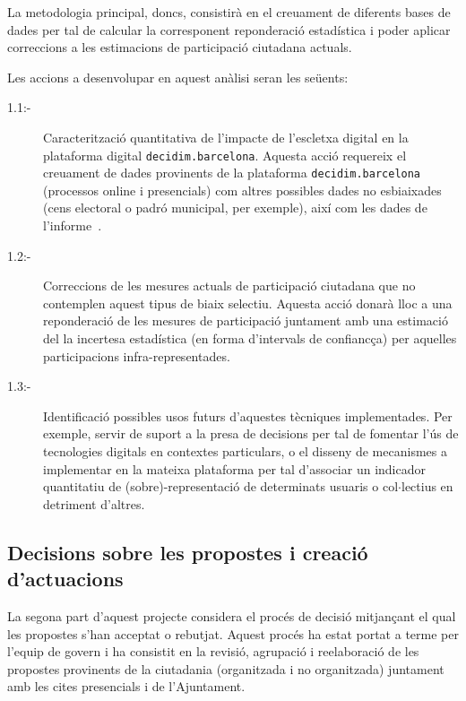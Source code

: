 \documentclass[final,10pt]{article}
\begin{document}
La metodologia principal, doncs, consistir\`a en el creuament de diferents bases de dades per tal de calcular la corresponent reponderaci\'o estad\'istica i poder aplicar correccions a les estimacions de participaci\'o ciutadana actuals.

Les accions a desenvolupar en aquest an\`alisi seran les se\"uents:
\begin{description}
\item[1.1:-] Caracteritzaci\'o quantitativa de l'impacte de l'escletxa digital en la plataforma digital \texttt{decidim.barcelona}.
Aquesta acci\'o requereix el creuament de dades provinents de la plataforma \texttt{decidim.barcelona} (processos online i presencials) com altres possibles dades no esbiaixades (cens electoral o padr\'o municipal, per exemple), aix\'i com les dades de l'informe~\cite{digital}.
\item[1.2:-] Correccions de les mesures actuals de participaci\'o ciutadana que no contemplen aquest tipus de biaix selectiu.
Aquesta acci\'o donar\`a lloc a una reponderaci\'o de les mesures de participaci\'o juntament amb una estimaci\'o del la incertesa estad\'istica (en forma d'intervals de confianc\c{c}a) per aquelles participacions infra-representades.
\item[1.3:-] Identificaci\'o possibles usos futurs d'aquestes t\`ecniques implementades.
Per exemple, servir de suport a la presa de decisions per tal de fomentar l'\'us de tecnologies digitals en contextes particulars,
o el disseny de mecanismes a implementar en la mateixa plataforma per tal d'associar un indicador quantitatiu de (sobre)-representaci\'o de determinats usuaris o col$\cdot$lectius en detriment d'altres.

\end{description}

\subsection{Decisions sobre les propostes i creaci\'o d'actuacions}
\label{partII}
La segona part d'aquest projecte considera el proc\'es de decisi\'o mitjan\c{c}ant el qual les propostes s'han acceptat o rebutjat. Aquest proc\'es ha estat portat a terme per l'equip de govern i ha consistit en la revisi\'o, agrupaci\'o i reelaboraci\'o de les propostes provinents de la ciutadania (organitzada i no organitzada) juntament amb les cites presencials i de l'Ajuntament.
\end{document}

